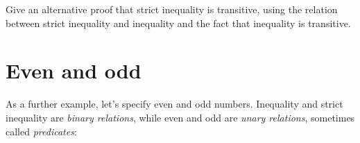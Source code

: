Give an alternative proof that strict inequality is transitive, using
the relation between strict inequality and inequality and the fact that
inequality is transitive.

\begin{fence}
\begin{code}%
\>[0]\<%
\end{code}
\end{fence}

\hypertarget{even-and-odd}{%
\section{Even and odd}\label{even-and-odd}}

As a further example, let's specify even and odd numbers. Inequality and
strict inequality are \emph{binary relations}, while even and odd are
\emph{unary relations}, sometimes called \emph{predicates}:

